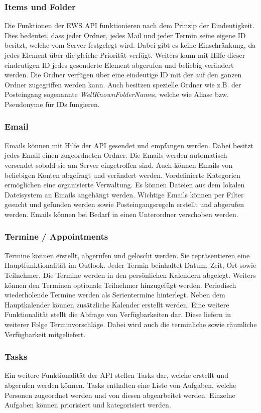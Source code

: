 \subsubsection{Items und Folder}
Die Funktionen der EWS API funktionieren nach dem Prinzip der Eindeutigkeit. Dies bedeutet, dass jeder Ordner, jedes Mail und jeder Termin seine eigene ID besitzt, welche vom Server festgelegt wird. Dabei gibt es keine Einschränkung, da jedes Element über die gleiche Priorität verfügt. Weiters kann mit Hilfe dieser eindeutigen ID jedes gesonderte Element abgerufen und beliebig verändert werden. Die Ordner  verfügen über eine eindeutige ID mit der auf den ganzen Ordner zugegriffen werden kann. Auch besitzen spezielle Ordner wie z.B. der Posteingang sogenannte \textit{WellKnownFolderName}s, welche wie Aliase bzw. Pseudonyme für IDs fungieren.\cite{ews2016}
\subsubsection{Email}
Emails können mit Hilfe der API gesendet und empfangen werden. Dabei besitzt jedes Email einen zugeordneten Ordner. Die Emails werden automatisch versendet sobald sie am Server eingetroffen sind. Auch können Emails von beliebigen Konten abgefragt und verändert werden. Vordefinierte Kategorien ermöglichen eine organisierte Verwaltung. Es können Dateien aus dem lokalen Dateisystem an Emails angehängt werden. Wichtige Emails können per Filter gesucht und gefunden werden sowie Posteingangsregeln erstellt und abgerufen werden. Emails können bei Bedarf in einen Unterordner verschoben werden. \cite{joos2013}
\subsubsection{Termine / Appointments}
Termine können erstellt, abgerufen und gelöscht werden. Sie repräsentieren eine Hauptfunktionalität im Outlook. Jeder Termin beinhaltet Datum, Zeit, Ort sowie Teilnehmer. Die Termine werden in den persönlichen Kalendern abgelegt. Weiters können den Terminen optionale Teilnehmer hinzugefügt werden. Periodisch wiederholende Termine werden als Serientermine hinterlegt. Neben dem Hauptkalender können zusätzliche Kalender erstellt werden. Eine weitere Funktionalität stellt die Abfrage von Verfügbarkeiten dar. Diese liefern in weiterer Folge Terminvorschläge. Dabei wird auch die terminliche sowie räumliche Verfügbarkeit mitgeliefert. \cite{joos2013}

\subsubsection{Tasks}
Ein weitere Funktionalität der API stellen Tasks dar, welche erstellt und abgerufen werden können. Tasks enthalten eine Liste von Aufgaben, welche Personen zugeordnet werden und von diesen abgearbeitet werden. Einzelne Aufgaben können priorisiert und kategorisiert werden.\cite{ews2016}
